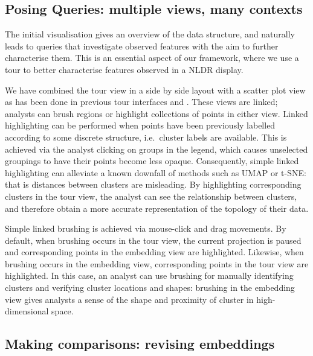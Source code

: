 \documentclass[article,notitle]{jdssv}
\begin{document}
\hypertarget{posing-queries-multiple-views-many-contexts}{%
\subsection{Posing Queries: multiple views, many contexts}\label{posing-queries-multiple-views-many-contexts}}

The initial visualisation gives an overview of the data structure,
and naturally leads to queries that investigate observed features with
the aim to further characterise them. This is an essential aspect of
our framework, where we use a tour to better characterise
features observed in a NLDR display.

We have combined the tour view in a side by side layout with a scatter plot
view as has been done in previous tour interfaces  and 
\citep{Buja1986-ku, Swayne1998-uq}. These views are
linked; analysts can brush regions or highlight collections of points in either
view. Linked highlighting can be performed when points have been previously
labelled according to some discrete structure, i.e.~cluster labels are
available. This is achieved via the analyst clicking on groups in the legend,
which causes unselected groupings to have their points become less opaque.
Consequently, simple linked highlighting can alleviate a known downfall of
methods such as UMAP or t-SNE: that is distances between clusters are
misleading. By highlighting corresponding clusters in the tour view, the
analyst can see the relationship between clusters, and therefore obtain a more
accurate representation of the topology of their data.

Simple linked brushing is achieved via mouse-click and drag movements. By
default, when brushing occurs in the tour view, the current projection is
paused and corresponding points in the embedding view are highlighted.
Likewise, when brushing occurs in the embedding view, corresponding points in
the tour view are highlighted. In this case, an analyst can use brushing for
manually identifying clusters and verifying cluster locations and shapes:
brushing in the embedding view gives analysts a sense of the shape and
proximity of cluster in high-dimensional space.

\hypertarget{making-comparisons-revising-embeddings}{%
\subsection{Making comparisons: revising embeddings}\label{making-comparisons-revising-embeddings}}
\end{document}
